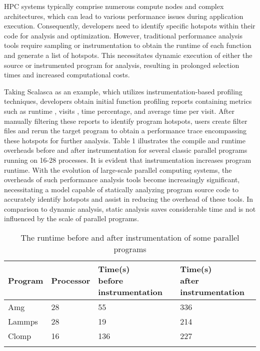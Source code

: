 \documentclass[lineno,sn-mathphys]{sn-jnl}%
\theoremstyle{thmstyleone}%
\theoremstyle{thmstyletwo}%
\theoremstyle{thmstylethree}%
\begin{document}
HPC systems typically comprise numerous compute nodes and complex architectures, which can lead to various performance issues during application execution. Consequently, developers need to identify specific hotspots within their code for analysis and optimization. However, traditional performance analysis tools require sampling or instrumentation to obtain the runtime of each function and generate a list of hotspots. This necessitates dynamic execution of either the source or instrumented program for analysis, resulting in prolonged selection times and increased computational costs.\par
Taking Scalasca as an example, which utilizes instrumentation-based profiling techniques, developers obtain initial function profiling reports containing metrics such as runtime , visits , time percentage, and average time per visit. After manually filtering these reports to identify program hotspots, users create filter files and rerun the target program to obtain a performance trace encompassing these hotspots for further analysis. Table 1 illustrates the compile and runtime overheads before and after instrumentation for several classic parallel programs running on 16-28 processes. It is evident that instrumentation increases program runtime. With the evolution of large-scale parallel computing systems, the overheads of such performance analysis tools become increasingly significant, necessitating a model capable of statically analyzing program source code to accurately identify hotspots and assist in reducing the overhead of these tools.
In comparison to dynamic analysis, static analysis saves considerable time and is not influenced by the scale of parallel programs.
\begin{table}[h]
\caption{The runtime before and after instrumentation of some parallel programs}\label{tab1}%
\begin{tabular}{@{}llll@{}}
    \toprule
    Program & Processor  & \makecell[l]{Time(s) \\before instrumentation} & \makecell[l]{Time(s) \\after instrumentation}\\
    \midrule
    Amg    & 28  & 55 & 336 \\
    Lammps    & 28   & 19  & 214 \\
    Clomp    & 16  & 136  & 227  \\
    \botrule
    \end{tabular}
\end{table}
\end{document}
